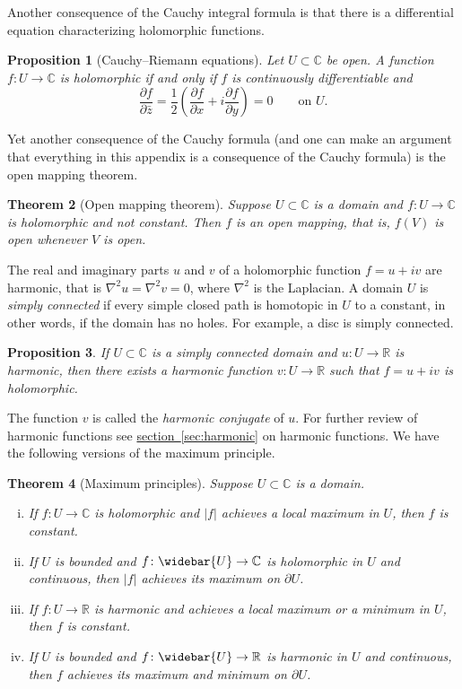 \documentclass[12pt,openany]{book}
\newcommand{\sabs}[1]{\lvert {#1} \rvert}
\newcommand{\C}{{\mathbb{C}}}
\newcommand{\R}{{\mathbb{R}}}
\newcommand{\myindex}[1]{#1\index{#1}}
\theoremstyle{plain}
\newtheorem{thm}{Theorem}[section]
\newtheorem{prop}[thm]{Proposition}
\theoremstyle{remark}
\theoremstyle{definition}
\theoremstyle{exercise}
\theoremstyle{example}
\newcommand{\sectionref}[1]{\hyperref[#1]{section~\ref*{#1}}}
\begin{document}
Another consequence  of the Cauchy integral formula is that there is
a differential equation characterizing holomorphic functions.

\begin{prop}[Cauchy--Riemann equations]
Let $U \subset \C$ be open.
A function $f \colon U \to \C$ is holomorphic if and only if
$f$ is continuously differentiable and
\begin{equation*}
\frac{\partial f}{\partial \bar{z}}
=
\frac{1}{2}
\left(
\frac{\partial f}{\partial x} + i
\frac{\partial f}{\partial y}
\right)
 = 0 \qquad \text{on $U$.}
\end{equation*}
\end{prop}

Yet another consequence of the Cauchy formula (and one can make an argument
that everything in this appendix is a consequence of the Cauchy formula)
is the open mapping theorem.

\begin{thm}[Open mapping theorem]
Suppose $U \subset \C$ is a domain and
$f \colon U \to \C$ is holomorphic and not constant.
Then $f$ is an open mapping, that is,
$f(V)$ is open whenever $V$ is open.
\end{thm}

The real and imaginary parts $u$ and $v$ of a holomorphic function $f =
u+iv$ are harmonic, that is
$\nabla^2 u = \nabla^2 v = 0$, where $\nabla^2$ is the
Laplacian.
A domain $U$ is \emph{\myindex{simply connected}} if every simple closed
path
is homotopic in $U$ to a constant, in other words, if the domain has no
holes.  For example, a disc is simply connected.

\begin{prop}
If $U \subset \C$ is a simply connected domain and $u \colon U \to \R$
is harmonic, then there exists a harmonic function $v \colon U \to \R$
such that $f = u+iv$ is holomorphic.
\end{prop}

The function $v$ is called the \emph{\myindex{harmonic conjugate}} of
$u$.  For further review of harmonic functions see
\sectionref{sec:harmonic} on harmonic functions.
We have the following versions of the maximum principle.

\begin{thm}[Maximum principles]
Suppose $U \subset \C$ is a domain.
\begin{enumerate}[(i)]
\item
If $f \colon U \to \C$ is holomorphic and $\sabs{f}$
achieves a local maximum in $U$, then $f$ is constant.
\item
If $U$ is bounded and $f \colon \widebar{U} \to \C$ is holomorphic in $U$
and continuous, then $\sabs{f}$ achieves its maximum on $\partial U$.
\item
If $f \colon U \to \R$ is harmonic and
achieves a local maximum or a minimum in $U$, then $f$ is constant.
\item
If $U$ is bounded and $f \colon \widebar{U} \to \R$ is harmonic in $U$
and continuous, then $f$ achieves its maximum and minimum on $\partial U$.
\end{enumerate}
\end{thm}
\end{document}
